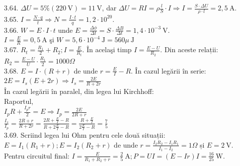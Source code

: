3.64. $\Delta U=5 \%(220 \mathrm{~V})=11 \mathrm{~V}$, dar $\Delta U=R I=\rho \frac{l}{S} \cdot I \Rightarrow I=\frac{S \cdot \Delta U}{\rho \cdot l}=2,5 \mathrm{~A}$.\\

3.65. $I=\frac{N \cdot q}{t} \Rightarrow N=\frac{I \cdot t}{q}=1,2 \cdot 10^{20}$.\\

3.66. $W=E \cdot I \cdot t$ unde $E=\frac{\Delta \phi}{\Delta t}=S \cdot \frac{\Delta B}{\Delta t}=1,4 \cdot 10^{-3} \mathrm{~V}$.\\ $I=\frac{E}{R}=0,5 \mathrm{~A}$ şi $W=5,6 \cdot 10^{-4} \mathrm{~J}=560 \mu \mathrm{~J}$\\

3.67. $R_{t}=\frac{R_{1}}{2}+R_{2} ; I=\frac{E}{R_{t}}$. În acelaşi timp $I=\frac{E-U}{R_{2}}$. Din aceste relații:\\ $R_{2}=\frac{E-U}{U} \cdot \frac{R_{1}}{2}=1000 \Omega$\\

3.68. $E=I \cdot(R+r)$ de unde $r=\frac{E}{I}-R$. În cazul legării în serie:\\ $2 E=I_{s}(E+2 r) \Rightarrow I_{s}=\frac{2 E}{R+2 r}$\\ În cazul legării în paralel, din legea lui Kirchhoff:\\ Raportul,\\ $I_{p} R+\frac{I_{p} r}{2}=E \Rightarrow I_{p}=\frac{2 E}{2 R+r}$\\ $\frac{I_{s}}{I_{p}}=\frac{2 R+r}{R+2 r}=\frac{2 R+\frac{E}{I}-R}{R+2 \frac{E}{I}-R}=\frac{R+\frac{E}{I}}{2 \frac{E}{I}-R}=\frac{7}{5}$\\

3.69. Scriind legea lui Ohm pentru cele două situații:\\ $E=I_{1}\left(R_{1}+r\right) ; E=I_{2}\left(R_{2}+r\right)$ de unde $r=\frac{I_{2} R_{2}-I_{1} R_{1}}{I_{1}-I_{2}}=1 \Omega$ și $E=2 \mathrm{~V}$.\\ Pentru circuitul final: $I=\frac{E}{R_{1}+R_{2}+r}=\frac{2}{5} \mathrm{~A} ; P=U I=(E-I r) I=\frac{16}{25} \mathrm{~W}$.\\

